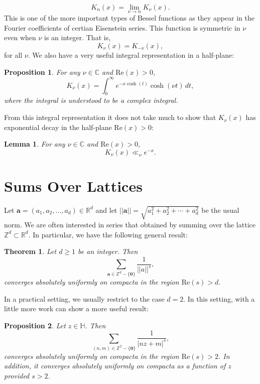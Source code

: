 \documentclass[12pt]{book}
\newtheorem{theorem}{Theorem}[section]
\newtheorem{proposition}{Proposition}[section]
\newtheorem{lemma}{Lemma}[section]
\theoremstyle{definition}\newframedtheorem{method}{Method}
\newcommand{\Z}{\mathbb{Z}}
\newcommand{\R}{\mathbb{R}}
\newcommand{\C}{\mathbb{C}}
\renewcommand{\H}{\mathbb{H}}
\newcommand{\<}{\langle}
\renewcommand{\>}{\rangle}
\renewcommand{\Re}{\mathrm{Re}}
\begin{document}
    \[
      K_{n}(x)= \lim_{\nu \to n}K_{\nu}(x).
    \]
    This is one of the more important types of Bessel functions as they appear in the Fourier coefficients of certian Eisenstein series. This function is symmetric in $\nu$ even when $\nu$ is an integer. That is,
    \[
      K_{\nu}(x) = K_{-\nu}(x),
    \]
    for all $\nu$. We also have a very useful integral representation in a half-plane:
    \begin{proposition}\label{prop:integral_representation_K-Bessel_function}
      For any $\nu \in \C$ and $\Re(x) > 0$,
      \[
        K_{\nu}(x) = \int_{0}^{\infty}e^{-x\cosh(t)}\cosh(\nu t)\,dt,
      \]
      where the integral is understood to be a complex integral.
    \end{proposition}
    From this integral representation it does not take much to show that $K_{\nu}(x)$ has exponential decay in the half-plane $\Re(x) > 0$:
    \begin{lemma}\label{lem:exponential_decay_K-Bessel_function}
      For any $\nu \in \C$ and $\Re(x) > 0$,
      \[
        K_{\nu}(x) \ll_{\nu} e^{-x}.
      \]
    \end{lemma}
  \section{Sums Over Lattices}
    Let $\mathbf{a} = (a_{1},a_{2},\ldots,a_{d}) \in \R^{d}$ and let $||\mathbf{a}|| = \sqrt{a_{1}^{2}+a_{2}^{2}+\cdots+a_{d}^{2}}$ be the usual norm. We are often interested in series that obtained by summing over the lattice $\Z^{d} \subset \R^{d}$. In particular, we have the following general result:

    \begin{theorem}
      Let $d \ge 1$ be an integer. Then
      \[
        \sum_{\mathbf{a} \in \Z^{d}-\{\mathbf{0}\}}\frac{1}{||a||^{s}},
      \]
      converges absolutely uniformly on compacta in the region $\Re(s) > d$.
    \end{theorem}

    In a practical setting, we usually restrict to the case $d = 2$. In this setting, with a little more work can show a more useful result:

    \begin{proposition}\label{prop:general_lattice_sum_convergence_for_two_variables}
      Let $z \in \H$. Then
      \[
        \sum_{(n,m) \in \Z^{2}-\{\mathbf{0}\}}\frac{1}{|nz+m|^{s}},
      \]
      converges absolutely uniformly on compacta in the region $\Re(s) > 2$. In addition, it converges absolutely uniformly on compacta as a function of $z$ provided $s > 2$.
    \end{proposition}
\end{document}
